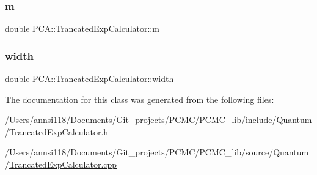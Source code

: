 \subsubsection{\texorpdfstring{m}{m}}
{\footnotesize\ttfamily double P\+C\+A\+::\+Trancated\+Exp\+Calculator\+::m\hspace{0.3cm}{\ttfamily [private]}}

\hypertarget{class_p_c_a_1_1_trancated_exp_calculator_a18ac7bab1a2ddc18bc214a089d05e4ee}{}\label{class_p_c_a_1_1_trancated_exp_calculator_a18ac7bab1a2ddc18bc214a089d05e4ee} 
\subsubsection{\texorpdfstring{width}{width}}
{\footnotesize\ttfamily double P\+C\+A\+::\+Trancated\+Exp\+Calculator\+::width\hspace{0.3cm}{\ttfamily [private]}}



The documentation for this class was generated from the following files\+:\begin{DoxyCompactItemize}
\item 
/\+Users/annsi118/\+Documents/\+Git\+\_\+projects/\+P\+C\+M\+C/\+P\+C\+M\+C\+\_\+lib/include/\+Quantum/\hyperlink{_trancated_exp_calculator_8h}{Trancated\+Exp\+Calculator.\+h}\item 
/\+Users/annsi118/\+Documents/\+Git\+\_\+projects/\+P\+C\+M\+C/\+P\+C\+M\+C\+\_\+lib/source/\+Quantum/\hyperlink{_trancated_exp_calculator_8cpp}{Trancated\+Exp\+Calculator.\+cpp}\end{DoxyCompactItemize}
